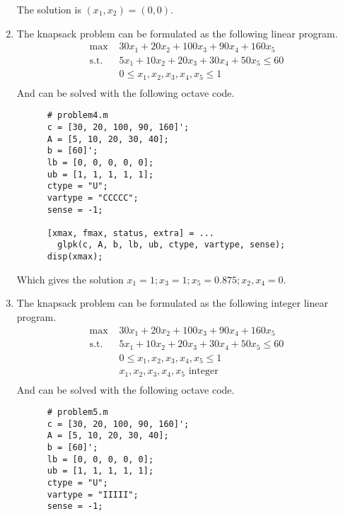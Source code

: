 \documentclass[12pt]{article}
\begin{document}
\begin{enumerate}
    The solution is $(x_1, x_2) = (0, 0)$.\\
  \item
    The knapsack problem can be formulated as the following linear program.\\
    \begin{equation}
      \begin{split}
      \text{max } & 30x_1 + 20x_2 + 100x_3 + 90x_4 + 160x_5 \\
      \text{s.t. } & 5x_1 + 10x_2 + 20x_3 + 30x_4 + 50x_5\leq 60 \\
      & 0\leq x_1, x_2, x_3, x_4, x_5\leq 1 \\
      \end{split}
    \end{equation}
    And can be solved with the following octave code.\\
    \begin{lstlisting}
      # problem4.m
      c = [30, 20, 100, 90, 160]';
      A = [5, 10, 20, 30, 40];
      b = [60]';
      lb = [0, 0, 0, 0, 0];
      ub = [1, 1, 1, 1, 1];
      ctype = "U";
      vartype = "CCCCC";
      sense = -1;

      [xmax, fmax, status, extra] = ...
        glpk(c, A, b, lb, ub, ctype, vartype, sense);
      disp(xmax);
    \end{lstlisting}
    Which gives the solution $x_1 = 1; x_3 = 1;x_5 = 0.875;x_2,x_4 = 0$.\\
  \item
    The knapsack problem can be formulated as the following integer linear program.\\
    \begin{equation}
      \begin{split}
      \text{max } & 30x_1 + 20x_2 + 100x_3 + 90x_4 + 160x_5 \\
      \text{s.t. } & 5x_1 + 10x_2 + 20x_3 + 30x_4 + 50x_5\leq 60 \\
      & 0\leq x_1, x_2, x_3, x_4, x_5\leq 1 \\
      & x_1, x_2, x_3, x_4, x_5 \text{ integer} \\
      \end{split}
    \end{equation}
    And can be solved with the following octave code.\\
    \begin{lstlisting}
      # problem5.m
      c = [30, 20, 100, 90, 160]';
      A = [5, 10, 20, 30, 40];
      b = [60]';
      lb = [0, 0, 0, 0, 0];
      ub = [1, 1, 1, 1, 1];
      ctype = "U";
      vartype = "IIIII";
      sense = -1;


\end{lstlisting}
\end{enumerate}
\end{document}
